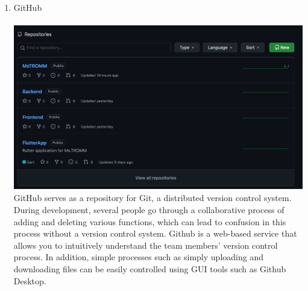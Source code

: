 \documentclass[conference]{IEEEtran}
\begin{document}
\begin{enumerate}
    \item GitHub\\\\
    \includegraphics[scale=0.9]{assets/Gtib.png}
    GitHub serves as a repository for Git, a distributed version control system. During development, several people go through a collaborative process of adding and deleting various functions, which can lead to confusion in this process without a version control system. Github is a web-based service that allows you to intuitively understand the team members' version control process. In addition, simple processes such as simply uploading and downloading files can be easily controlled using GUI tools such as Github Desktop. \\\\\\\\\\\\\\\\\\
    

\end{enumerate}
\end{document}
